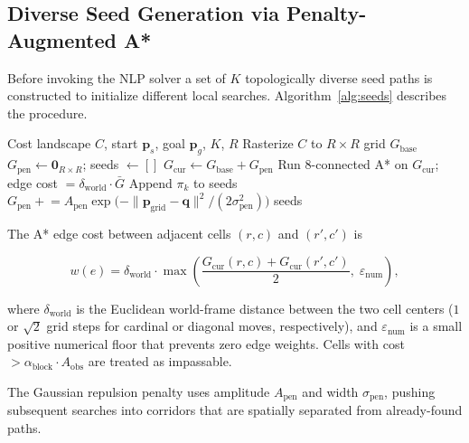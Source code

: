 \documentclass[11pt,a4paper]{article}
\begin{document}
\subsection{Diverse Seed Generation via Penalty-Augmented A*}

Before invoking the NLP solver a set of $K$ topologically diverse seed paths
is constructed to initialize different local searches.
Algorithm~\ref{alg:seeds} describes the procedure.

\begin{algorithm}[H]
\caption{Diverse seed paths via penalty-augmented A*}
\label{alg:seeds}
\begin{algorithmic}[1]
\Require Cost landscape $C$, start $\mathbf{p}_s$, goal $\mathbf{p}_g$, $K$, $R$
\State Rasterize $C$ to $R \times R$ grid $G_{\mathrm{base}}$
\State $G_{\mathrm{pen}} \leftarrow \mathbf{0}_{R \times R}$; \quad seeds $\leftarrow []$
  \State $G_{\mathrm{cur}} \leftarrow G_{\mathrm{base}} + G_{\mathrm{pen}}$
  \State Run 8-connected A* on $G_{\mathrm{cur}}$; edge cost $= \delta_{\mathrm{world}} \cdot \bar{G}$
    \State Append $\pi_k$ to seeds
      \State $G_{\mathrm{pen}} \mathrel{+}=
               A_{\mathrm{pen}} \exp\!\bigl(-\|\mathbf{p}_{\mathrm{grid}} - \mathbf{q}\|^2 /
               (2\sigma_{\mathrm{pen}}^2)\bigr)$
    \EndFor
  \EndIf
\EndFor
\State \Return seeds
\end{algorithmic}
\end{algorithm}

The A* edge cost between adjacent cells $(r,c)$ and $(r',c')$ is

\begin{equation}
  w(e) = \delta_{\mathrm{world}} \cdot
         \max\!\left(\frac{G_{\mathrm{cur}}(r,c) + G_{\mathrm{cur}}(r',c')}{2},\;
         \varepsilon_{\mathrm{num}}\right),
\end{equation}

where $\delta_{\mathrm{world}}$ is the Euclidean world-frame distance between
the two cell centers ($1$ or $\sqrt{2}$ grid steps for cardinal or diagonal
moves, respectively), and $\varepsilon_{\mathrm{num}}$ is a small positive
numerical floor that prevents zero edge weights.
Cells with cost $> \alpha_{\mathrm{block}} \cdot A_{\mathrm{obs}}$ are treated
as impassable.

The Gaussian repulsion penalty uses amplitude $A_{\mathrm{pen}}$ and
width $\sigma_{\mathrm{pen}}$, pushing subsequent searches into corridors that
are spatially separated from already-found paths.
\end{document}
